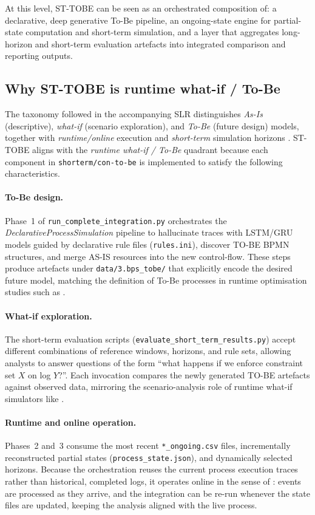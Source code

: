 \documentclass[a4paper,fleqn]{cas-sc}
\begin{document}
At this level, ST-TOBE can be seen as an orchestrated composition of:
a declarative, deep generative To-Be pipeline,
an ongoing-state engine for partial-state computation and short-term simulation,
and a layer that aggregates long-horizon and short-term evaluation artefacts
into integrated comparison and reporting outputs.

\subsection{Why ST-TOBE is runtime what-if / To-Be}

The taxonomy followed in the accompanying SLR distinguishes
\emph{As-Is} (descriptive), \emph{what-if} (scenario exploration), and
\emph{To-Be} (future design) models, together with \emph{runtime/online}
execution and \emph{short-term} simulation horizons
\citep{Meneghello2025IS,Middelhuis2025IS,Avramenko2025arXiv,ChapelaCampa2025TSC}.
ST-TOBE aligns with the \emph{runtime what-if / To-Be} quadrant because each
component in \verb|shorterm/con-to-be| is implemented to satisfy the
following characteristics.

\paragraph{To-Be design.}
Phase~1 of \verb|run_complete_integration.py| orchestrates the
\emph{DeclarativeProcessSimulation} pipeline to hallucinate traces with
LSTM/GRU models guided by declarative rule files (\verb|rules.ini|),
discover TO-BE BPMN structures, and merge AS-IS resources into the new
control-flow. These steps produce artefacts under
\verb|data/3.bps_tobe/| that explicitly encode the desired future model,
matching the definition of To-Be processes in runtime optimisation
studies such as \citep{Middelhuis2025IS}.

\paragraph{What-if exploration.}
The short-term evaluation scripts (\verb|evaluate_short_term_results.py|)
accept different combinations of reference windows, horizons, and rule
sets, allowing analysts to answer questions of the form ``what happens if
we enforce constraint set $X$ on log $Y$?''. Each invocation compares the
newly generated TO-BE artefacts against observed data, mirroring the
scenario-analysis role of runtime what-if simulators like
\citep{Meneghello2025IS}.

\paragraph{Runtime and online operation.}
Phases~2 and~3 consume the most recent \verb|*_ongoing.csv| files,
incrementally reconstructed partial states (\verb|process_state.json|),
and dynamically selected horizons. Because the orchestration reuses the
current process execution traces rather than historical, completed logs,
it operates online in the sense of \citep{ChapelaCampa2025TSC}: events are
processed as they arrive, and the integration can be re-run whenever the
state files are updated, keeping the analysis aligned with the live
process.
\end{document}
